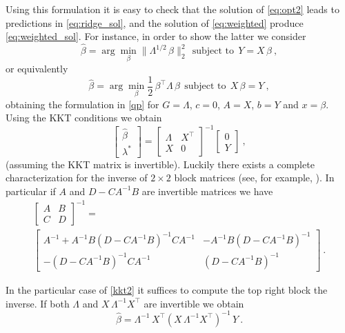 \documentclass[12pt,letterpaper]{article}
\begin{document}
Using this formulation it is easy to check that the solution of \eqref{eq:opt2} leads to predictions in \eqref{eq:ridge_sol}, and the solution of \eqref{eq:weighted} produce \eqref{eq:weighted_sol}. For instance, in order to show the latter we consider 
\begin{equation} \label{eq:weighted_app}
    \hat{\beta} = \arg\min_\beta \|\Lambda^{1/2}\,\beta\|_2^2 ~~\mbox{subject to}~~ Y = X\,\beta
    ~,
\end{equation}
or equivalently 
\begin{equation}
    \hat{\beta} = \arg\min_\beta \frac{1}{2}\,\beta^\top \Lambda\,\beta ~~\mbox{subject to}~~  X\,\beta = Y
    ~,
\end{equation}
obtaining the formulation in \eqref{qp} for $G=\Lambda$, $c=0$, $A=X$, $b=Y$ and $x=\beta$. Using the KKT conditions we obtain
\begin{equation}
    \left[
    \begin{matrix}
    \hat \beta \\ 
    \lambda^*
    \end{matrix}\right] =
    \left[
    \begin{matrix}
    \Lambda & X^\top \\ 
    X & 0
    \end{matrix}\right]^{-1}
    \left[
    \begin{matrix}
    0 \\ 
    Y
    \end{matrix}\right]
    ~,
    \label{kkt2}
\end{equation}
(assuming the KKT matrix is invertible). Luckily there exists a complete characterization for the inverse of $2\times 2$ block matrices (see, for example, \citealt{lu2002inverses}). In particular if $A$ and $D - CA^{-1}B$ are invertible matrices we have
\begin{multline} 
 {\begin{bmatrix}  {A} &   {B} \\  {C} &  {D} \end{bmatrix}}^{-1}= \\ {\begin{bmatrix}  {A} ^{-1}+  {A} ^{-1}  {B} \left(  {D} -  {CA} ^{-1}  {B} \right)^{-1}  {CA} ^{-1}& -  {A} ^{-1}  {B} \left(  {D} -  {CA} ^{-1}  {B} \right)^{-1}\\-\left(  {D} -  {CA} ^{-1}  {B} \right)^{-1}  {CA} ^{-1}& \left(  {D} -  {CA} ^{-1}  {B} \right)^{-1}\end{bmatrix}}
 ~.
\end{multline}

In the particular case of \eqref{kkt2} it suffices to compute the top right block the inverse. If both $\Lambda$ and $X\,\Lambda^{-1}X^\top$ are invertible we obtain 
\begin{equation}
    \hat \beta = \Lambda^{-1}\,X^\top(X\,\Lambda^{-1}X^\top)^{-1}\,Y
    ~. 
\end{equation}
\end{document}
